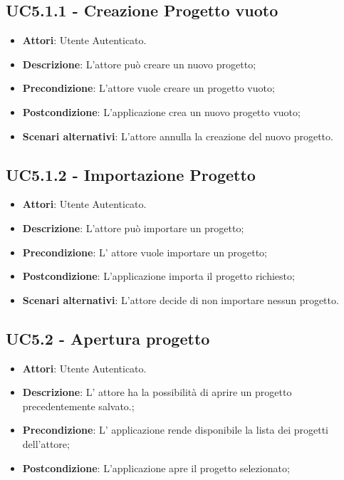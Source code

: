 \subsection{UC5.1.1 - Creazione Progetto vuoto} 
\label{ssec:UC5.1.1} 
\begin{itemize} 
\item \textbf{Attori}: Utente Autenticato.
\item \textbf{Descrizione}: L'attore può creare un nuovo progetto;
\item \textbf{Precondizione}: L'attore vuole creare un progetto vuoto;
\item \textbf{Postcondizione}: L'applicazione crea un nuovo progetto vuoto;
\item \textbf{Scenari alternativi}: L'attore annulla la creazione del nuovo progetto.
\end{itemize} 
\subsection{UC5.1.2 - Importazione Progetto} 
\label{ssec:UC5.1.2} 
\begin{itemize} 
\item \textbf{Attori}: Utente Autenticato.
\item \textbf{Descrizione}: L'attore può importare un progetto;
\item \textbf{Precondizione}: L' attore vuole importare un progetto;
\item \textbf{Postcondizione}: L'applicazione importa il progetto richiesto;
\item \textbf{Scenari alternativi}: L'attore decide di non importare nessun progetto.
\end{itemize} 
\subsection{UC5.2 - Apertura progetto} 
\label{ssec:UC5.2} 
\begin{itemize} 
\item \textbf{Attori}: Utente Autenticato.
\item \textbf{Descrizione}: L’ attore ha la possibilità di aprire un progetto precedentemente salvato.;
\item \textbf{Precondizione}: L’ applicazione rende disponibile la lista dei progetti dell'attore;
\item \textbf{Postcondizione}: L’applicazione apre il progetto selezionato;
\end{itemize} 
